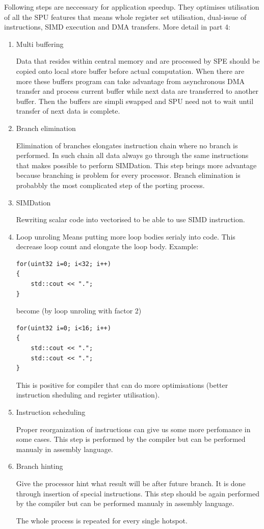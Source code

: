 Following steps are neccessary for application speedup.
They optimises utilisation of all the SPU features that means whole register set utilisation, dual-issue of instructions, SIMD execution and DMA transfers.
More detail in \cite{writingPerfApps} part 4:
\begin{enumerate}
\item{Multi buffering}
\par
Data that resides within central memory and are processed by SPE should be copied onto local store buffer before actual computation.
When there are more these buffers program can take advantage from asynchronous DMA transfer and process current buffer while next data are transferred to another buffer.
Then the buffers are simpli swapped and SPU need not to wait until transfer of next data is complete.

\item{Branch elimination}
\par
Elimination of branches elongates instruction chain where no branch is performed.
In such chain all data always go through the same instructions that makes possible to perform SIMDation.
This step brings more advantage because branching is problem for every processor.
Branch elimination is probabbly the most complicated step of the porting process.

\item{SIMDation}
\par
Rewriting scalar code into vectorised to be able to use SIMD instruction.

\item{Loop unroling}
Means putting more loop bodies serialy into code.
This decrease loop count and elongate the loop body.
Example:
\begin{verbatim}
for(uint32 i=0; i<32; i++)
{
    std::cout << ".";
}
\end{verbatim}
become (by loop unroling with factor 2)
\begin{verbatim}
for(uint32 i=0; i<16; i++)
{
    std::cout << ".";
    std::cout << ".";
}
\end{verbatim}
This is positive for compiler that can do more optimisations (better instruction sheduling and register utilisation).

\item{Instruction scheduling}
\par
Proper reorganization of instructions can give us some more perfomance in some cases.
This step is performed by the compiler but can be performed manualy in assembly language.

\item{Branch hinting}
\par
Give the processor hint what result will be after future branch.
It is done through insertion of special instructions.
This step should be again performed by the compiler but can be performed manualy in assembly language.

The whole process is repeated for every single hotspot.
\end{enumerate}

